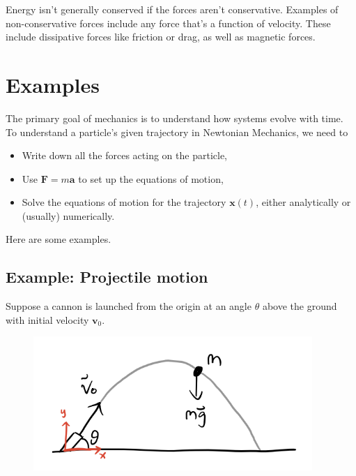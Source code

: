 \documentclass[
  letterpaper,
  DIV=11,
  numbers=noendperiod]{scrreprt}
\providecommand{\tightlist}{%
  \setlength{\itemsep}{0pt}\setlength{\parskip}{0pt}}\usepackage{longtable,booktabs,array}
\begin{document}
Energy isn't generally conserved if the forces aren't conservative.
Examples of non-conservative forces include any force that's a function
of velocity. These include dissipative forces like friction or drag, as
well as magnetic forces.

\hypertarget{examples}{%
\section{Examples}\label{examples}}

The primary goal of mechanics is to understand how systems evolve with
time. To understand a particle's given trajectory in Newtonian
Mechanics, we need to

\begin{itemize}
\tightlist
\item
  Write down all the forces acting on the particle,
\item
  Use \(\mathbf{F} = m \mathbf{a}\) to set up the equations of motion,
\item
  Solve the equations of motion for the trajectory \(\mathbf{x}(t)\),
  either analytically or (usually) numerically.
\end{itemize}

Here are some examples.

\hypertarget{example-projectile-motion}{%
\subsection{Example: Projectile
motion}\label{example-projectile-motion}}

Suppose a cannon is launched from the origin at an angle \(\theta\)
above the ground with initial velocity \(\mathbf{v}_0\).

\begin{figure}

{\centering \includegraphics[width=4.16667in,height=\textheight]{classical-mechanics/./resources/image-20230212040005693.png}

}

\end{figure}
\end{document}
